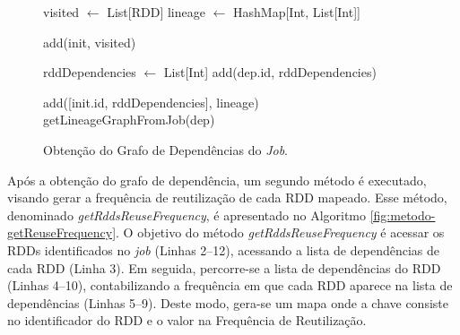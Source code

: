 \begin{figure}[!ht]
    \begin{algorithm}[H]
    \label{fig:metodo-getLineageGraph}
    \caption{Obtenção do Grafo de Dependências do \textit{Job}.}
        
        \BlankLine
        visited $\leftarrow$ List[RDD]\;
        lineage $\leftarrow$ HashMap[Int, List[Int]]\;
        
        \BlankLine
         {
           add(init, visited)\;
           
           \BlankLine
           rddDependencies $\leftarrow$ List[Int]\;
            {
                add(dep.id, rddDependencies)\;
           }
           
           \BlankLine
           add([init.id, rddDependencies], lineage)\;
            {
                 {
                    getLineageGraphFromJob(dep)\;
                }
           }
        }
    \end{algorithm}
\end{figure}


Após a obtenção do grafo de dependência, um segundo método é executado, visando gerar a frequência de reutilização de cada RDD mapeado. Esse método, denominado \textit{getRddsReuseFrequency}, é apresentado no Algoritmo \ref{fig:metodo-getReuseFrequency}. O objetivo do método  \textit{getRddsReuseFrequency} é acessar os RDDs identificados no \textit{job} (Linhas 2--12), acessando a lista de dependências de cada RDD (Linha 3). Em seguida, percorre-se a lista de dependências do RDD (Linhas 4--10), contabilizando a frequência em que cada RDD aparece na lista de dependências (Linhas 5--9). Deste modo, gera-se um mapa onde a chave consiste no identificador do RDD e o valor na Frequência de Reutilização.


